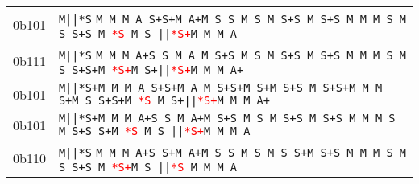 \begin{table}[!ht]
{{\begin{tabular}{r|l}
 0b1{\color{red}01} & \texttt{M}\space \texttt{||}\space \texttt{*S\space}  \texttt{M  M  M A }\space \texttt{S+}\space \texttt{S+}\space \texttt{M A+}\space \texttt{M S }\space \texttt{S }\space \texttt{M S }\space \texttt{M S+}\space \texttt{S }\space \texttt{M  S+}\space \texttt{S }\space \texttt{M  M  M S }\space \texttt{M S }\space \texttt{S+}\space \texttt{S }\space \texttt{M \textcolor{red}{*S }}\space \texttt{M S }\space \texttt{||}\space \texttt{\textcolor{red}{*S+}}\space \texttt{M M M A } \\
 0b1{\color{red}11} & \texttt{M}\space \texttt{||}\space \texttt{*S\space}  \texttt{M  M  M A+}\space \texttt{S }\space \texttt{S }\space \texttt{M A }\space \texttt{M S+}\space \texttt{S }\space \texttt{M S }\space \texttt{M S+}\space \texttt{S }\space \texttt{M S+}\space  \texttt{S }\space \texttt{M  M  M S }\space \texttt{M S }\space \texttt{S+}\space \texttt{S+}\space \texttt{M \textcolor{red}{*S+}}\space \texttt{M S+}\space \texttt{||}\space \texttt{\textcolor{red}{*S+}}\space \texttt{M M M A+} \\
 0b1{\color{red}01} & \texttt{M}\space \texttt{||}\space \texttt{*S+}\space \texttt{M  M  M A }\space \texttt{S+}\space \texttt{S+}\space \texttt{M A }\space \texttt{M S+}\space \texttt{S+}\space \texttt{M S+}\space \texttt{M S+}\space \texttt{S }\space \texttt{M  S+}\space \texttt{S+}\space \texttt{M  M  M S+}\space \texttt{M S }\space \texttt{S+}\space \texttt{S+}\space \texttt{M \textcolor{red}{*S }}\space \texttt{M S+}\space \texttt{||}\space \texttt{\textcolor{red}{*S+}}\space \texttt{M M M A+} \\
 0b1{\color{red}01} & \texttt{M}\space \texttt{||}\space \texttt{*S+}\space \texttt{M  M  M A+}\space \texttt{S }\space \texttt{S }\space \texttt{M A+}\space \texttt{M S+}\space \texttt{S }\space \texttt{M S }\space \texttt{M S+}\space \texttt{S }\space \texttt{M  S+}\space \texttt{S }\space \texttt{M  M  M S }\space \texttt{M S+}\space \texttt{S }\space \texttt{S+}\space \texttt{M \textcolor{red}{*S }}\space \texttt{M S }\space \texttt{||}\space \texttt{\textcolor{red}{*S+}}\space \texttt{M M M A } \\
 0b1{\color{red}10} & \texttt{M}\space \texttt{||}\space \texttt{*S\space}  \texttt{M  M  M A+}\space \texttt{S }\space \texttt{S+}\space \texttt{M A+}\space \texttt{M S }\space \texttt{S }\space \texttt{M S }\space \texttt{M S }\space \texttt{S+}\space \texttt{M S+}\space  \texttt{S }\space \texttt{M  M  M S }\space \texttt{M S }\space \texttt{S+}\space \texttt{S }\space \texttt{M \textcolor{red}{*S+}}\space \texttt{M S }\space \texttt{||}\space \texttt{\textcolor{red}{*S }}\space \texttt{M M M A } \\
\end{tabular}
}
}
\end{table}